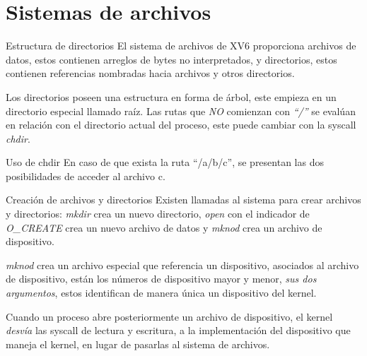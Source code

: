 \documentclass{libs/ufc_format}
\begin{document}
\section{Sistemas de archivos}
\begin{frame}{Estructura de directorios}
  El sistema de archivos de XV6 proporciona archivos de datos, estos contienen arreglos de bytes no interpretados, y directorios, estos contienen referencias nombradas hacia archivos y otros directorios.

  \vspace{0.3cm}

  Los directorios poseen una estructura en forma de árbol, este empieza en un directorio especial llamado raíz. Las rutas que \emph{NO} comienzan con \emph{“/”} se evalúan en relación con el directorio actual del proceso, este puede cambiar con la syscall \textit{chdir}.
\end{frame}
\begin{frame}{Uso de chdir}
  En caso de que exista la ruta “/a/b/c”, se presentan las dos posibilidades de acceder al archivo c.
  
\end{frame}
\begin{frame}{Creación de archivos y directorios}
  Existen llamadas al sistema para crear archivos y directorios: \textit{\emph{mkdir}} crea un nuevo directorio, \textit{\emph{open}} con el indicador de \textit{\emph{O\_CREATE}} crea un nuevo archivo de datos y \textit{\emph{mknod}} crea un archivo de dispositivo.

  \vspace{0.3cm}

  \textit{\emph{mknod}} crea un archivo especial que referencia un dispositivo, asociados al archivo de dispositivo, están los números de dispositivo mayor y menor, \emph{sus dos argumentos}, estos identifican de manera única un dispositivo del kernel.

  \vspace{0.3cm}

  Cuando un proceso abre posteriormente un archivo de dispositivo, el kernel \textit{desvía} las syscall de lectura y escritura, a la implementación del dispositivo que maneja el kernel, en lugar de pasarlas al sistema de archivos.
\end{frame}
\end{document}
